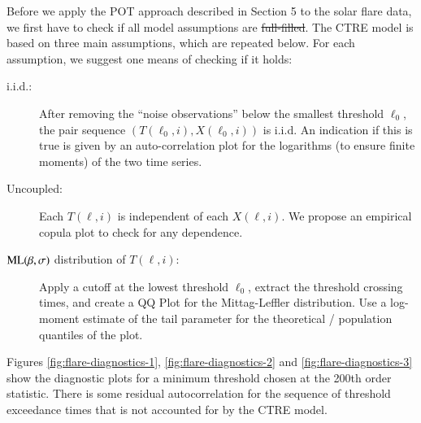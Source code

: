 \documentclass[]{elsarticle} %
\providecommand{\DIFaddtex}[1]{{\protect\color{blue}\uwave{#1}}} %
\providecommand{\DIFdeltex}[1]{{\protect\color{red}\sout{#1}}}                      %
\providecommand{\DIFaddbegin}{} %
\providecommand{\DIFaddend}{} %
\providecommand{\DIFdelbegin}{} %
\providecommand{\DIFdelend}{} %
\providecommand{\DIFadd}[1]{\texorpdfstring{\DIFaddtex{#1}}{#1}} %
\providecommand{\DIFdel}[1]{\texorpdfstring{\DIFdeltex{#1}}{}} %
\newcommand{\DIFscaledelfig}{0.5}
\newlength{\DIFdelgraphicswidth} %
\newlength{\DIFdelgraphicsheight} %
\newcommand{\DIFaddincludegraphics}[2][]{{\color{blue}\fbox{\DIFOincludegraphics[#1]{#2}}}} %
\newcommand{\DIFdelincludegraphics}[2][]{%
\sbox{\DIFdelgraphicsbox}{\DIFOincludegraphics[#1]{#2}}%
\settoboxwidth{\DIFdelgraphicswidth}{\DIFdelgraphicsbox} %
\settoboxtotalheight{\DIFdelgraphicsheight}{\DIFdelgraphicsbox} %
\scalebox{\DIFscaledelfig}{%
\parbox[b]{\DIFdelgraphicswidth}{\usebox{\DIFdelgraphicsbox}\\[-\baselineskip] \rule{\DIFdelgraphicswidth}{0em}}\llap{\resizebox{\DIFdelgraphicswidth}{\DIFdelgraphicsheight}{%
\setlength{\unitlength}{\DIFdelgraphicswidth}%
\begin{picture}(1,1)%
\thicklines\linethickness{2pt} %
{\color[rgb]{1,0,0}\put(0,0){\framebox(1,1){}}}%
{\color[rgb]{1,0,0}\put(0,0){\line( 1,1){1}}}%
{\color[rgb]{1,0,0}\put(0,1){\line(1,-1){1}}}%
\end{picture}%
}\hspace*{3pt}}} %
} %
\DeclareRobustCommand{\DIFaddbegin}{\DIFOaddbegin \let\includegraphics\DIFaddincludegraphics} %
\DeclareRobustCommand{\DIFaddend}{\DIFOaddend \let\includegraphics\DIFOincludegraphics} %
\DeclareRobustCommand{\DIFdelbegin}{\DIFOdelbegin \let\includegraphics\DIFdelincludegraphics} %
\DeclareRobustCommand{\DIFdelend}{\DIFOaddend \let\includegraphics\DIFOincludegraphics} %
\begin{document}
Before we apply the POT approach described in Section 5 to the solar
flare data, we first have to check if all model assumptions are
\DIFdelbegin \DIFdel{full-filled}\DIFdelend \DIFaddbegin \DIFadd{fulfilled}\DIFaddend . The CTRE model is based on three main assumptions, which are
repeated below. For each assumption, we suggest one means of checking if
it holds:

\begin{description}
\item[i.i.d.:]
After removing the ``noise observations'' below the smallest threshold
\(\ell_0\), the pair sequence \((T(\ell_0, i), X(\ell_0,i))\) is i.i.d.
An indication if this is true is given by an auto-correlation plot for
the logarithms (to ensure finite moments) of the two time series.
\item[Uncoupled:]
Each \(T(\ell, i)\) is independent of each \(X(\ell, i)\). We propose an
empirical copula plot to check for any dependence.
\item[\({\rm ML}(\beta, \sigma)\) distribution of \(T(\ell, i)\):]
Apply a cutoff at the lowest threshold \(\ell_0\), extract the threshold
crossing times, and create a QQ Plot for the Mittag-Leffler
distribution. Use a log-moment estimate of the tail parameter for the
theoretical / population quantiles of the plot.
\end{description}

Figures \ref{fig:flare-diagnostics-1}, \ref{fig:flare-diagnostics-2} and
\ref{fig:flare-diagnostics-3} show the diagnostic plots for a minimum
threshold chosen at the 200th order statistic. There is some residual
autocorrelation for the sequence of threshold exceedance times that is
not accounted for by the CTRE model.
\end{document}
